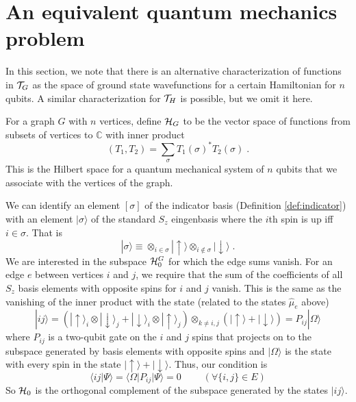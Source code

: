 \documentclass[12pt]{article}
\theoremstyle{definition}
\begin{document}
\section{An equivalent quantum mechanics problem}

In this section, we note that there is an alternative characterization of functions in ${\cal T}_G$ as the space of ground state wavefunctions for a certain Hamiltonian for $n$ qubits. A similar characterization for ${\cal T}_H$ is possible, but we omit it here.

For a graph $G$ with $n$ vertices, define ${\cal H}_G$ to be the vector space of functions from subsets of vertices to $\mathbb{C}$ with inner product
\[
(T_1,T_2) = \sum_{\sigma} T_1(\sigma)^* T_2(\sigma) \; .
\]
This is the Hilbert space for a quantum mechanical system of $n$ qubits that we associate with the vertices of the graph.

We can identify an element $[\sigma]$ of the indicator basis (Definition \ref{def:indicator}) with an element $|\sigma \rangle$ of the standard $S_z$ eingenbasis where the $i$th spin is up iff $i \in \sigma$. That is 
\[
|\sigma \rangle \equiv \otimes_{i \in \sigma} |\uparrow \rangle \otimes_{i \notin \sigma} | \downarrow \rangle \; .
\]
We are interested in the subspace ${\cal H}^G_0$ for which the edge sums vanish. For an edge $e$ between vertices $i$ and $j$, we require that the sum of the coefficients of all $S_z$ basis elements with opposite spins for $i$ and $j$ vanish. This is the same as the vanishing of the inner product with the state (related to the states $\hat{\mu}_e$ above)
\[
|ij\rangle = (|\uparrow \rangle_i \otimes |\downarrow \rangle_j +  |\downarrow \rangle_i \otimes |\uparrow \rangle_j) \otimes_{k \ne i,j} (|\uparrow \rangle + |\downarrow \rangle )= P_{ij} |\Omega \rangle
\]
where $P_{ij}$ is a two-qubit gate on the $i$ and $j$ spins that projects on to the subspace generated by basis elements with opposite spins and $|\Omega \rangle$ is the state with every spin in the state $|\uparrow \rangle + |\downarrow \rangle$. Thus, our condition is
\[
\langle ij|\Psi \rangle = \langle \Omega | P_{ij} | \Psi \rangle = 0 \;  \qquad (\forall \{i,j\} \in E)
\]
So ${\cal H}_0$ is the orthogonal complement of the subspace generated by  the states $|ij \rangle$.
\end{document}
